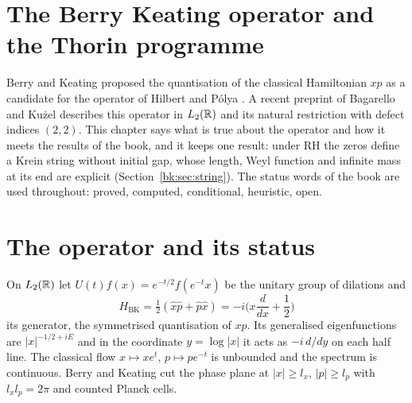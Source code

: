 \section{The Berry Keating operator and the Thorin programme}\label{ch:bk}

Berry and Keating proposed the quantisation of the classical Hamiltonian $xp$ as a candidate for the operator of Hilbert and P\'olya \cite{BerryKeating99}. A recent preprint of Bagarello and Ku\.{z}el \cite{BagarelloKuzel26} describes this operator in $L_2(\mathbb{R})$ and its natural restriction with defect indices $(2,2)$. This chapter says what is true about the operator and how it meets the results of the book, and it keeps one result: under RH the zeros define a Krein string without initial gap, whose length, Weyl function and infinite mass at its end are explicit (Section~\ref{bk:sec:string}). The status words of the book are used throughout: proved, computed, conditional, heuristic, open.

\section{The operator and its status}\label{bk:sec:op}

On $L_2(\mathbb{R})$ let $U(t)f(x)=e^{-t/2}f(e^{-t}x)$ be the unitary group of dilations and
\begin{equation}\label{bk:eq:H}
H_{\mathrm{BK}}=\tfrac12(\hat x\hat p+\hat p\hat x)=-i\Big(x\frac{d}{dx}+\frac12\Big)
\end{equation}
its generator, the symmetrised quantisation of $xp$. Its generalised eigenfunctions are $|x|^{-1/2+iE}$ and in the coordinate $y=\log|x|$ it acts as $-i\,d/dy$ on each half line. The classical flow $x\mapsto xe^t$, $p\mapsto pe^{-t}$ is unbounded and the spectrum is continuous. Berry and Keating cut the phase plane at $|x|\ge l_x$, $|p|\ge l_p$ with $l_xl_p=2\pi$ and counted Planck cells.

